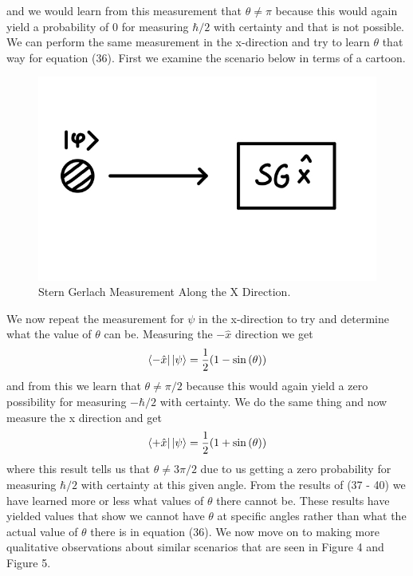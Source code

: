 \documentclass[twocolumn]{article}
\begin{document}
and we would learn from this measurement that $\theta \neq \pi$ because this would again yield a probability of $0$ for measuring $\hbar/2$ with certainty and that is not possible. We can perform the same measurement in the x-direction and try to learn $\theta$ that way for equation (36). First we examine the scenario below in terms of a cartoon.
\begin{figure}[htpb]
\begin{center}
\includegraphics[width=0.70\linewidth]{SG-Measurement-X-One-Time.PNG}
\caption{Stern Gerlach Measurement Along the X Direction.}
\end{center}
\end{figure}
\newline
We now repeat the measurement for $\psi$ in the x-direction to try and determine what the value of $\theta$ can be. Measuring the $-\hat{x}$ direction we get
\begin{equation}
\bra{-\hat{x}}\ket{\psi}=\frac{1}{2}(1-\sin{(\theta)})
\end{equation}
and from this we learn that $\theta \neq \pi/2$ because this would again yield a zero possibility for measuring $-\hbar/2$ with certainty. We do the same thing and now measure the x direction and get
\begin{equation}
\bra{+\hat{x}}\ket{\psi}=\frac{1}{2}(1+\sin{(\theta)})
\end{equation}
where this result tells us that $\theta \neq 3\pi/2$ due to us getting a zero probability for measuring $\hbar/2$ with certainty at this given angle. From the results of (37 - 40) we have learned more or less what values of $\theta$ there cannot be. These results have yielded values that show we cannot have $\theta$ at specific angles rather than what the actual value of $\theta$ there is in equation (36). We now move on to making more qualitative observations about similar scenarios that are seen in Figure 4 and Figure 5.
\end{document}
